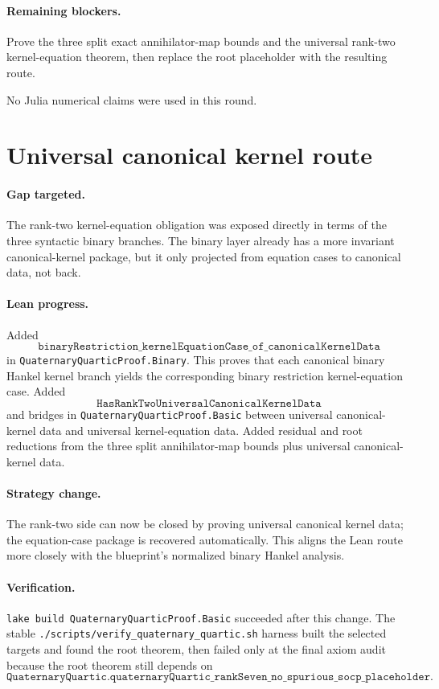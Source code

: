 \documentclass[11pt]{article}
\begin{document}
\paragraph{Remaining blockers.}
Prove the three split exact annihilator-map bounds and the universal rank-two
kernel-equation theorem, then replace the root placeholder with the resulting
route.

No Julia numerical claims were used in this round.

\section*{Universal canonical kernel route}

\paragraph{Gap targeted.}
The rank-two kernel-equation obligation was exposed directly in terms of the
three syntactic binary branches.  The binary layer already has a more invariant
canonical-kernel package, but it only projected from equation cases to canonical
data, not back.

\paragraph{Lean progress.}
Added
\[
\texttt{binaryRestriction\_kernelEquationCase\_of\_canonicalKernelData}
\]
in \texttt{QuaternaryQuarticProof.Binary}.  This proves that each canonical
binary Hankel kernel branch yields the corresponding binary restriction
kernel-equation case.  Added
\[
\texttt{HasRankTwoUniversalCanonicalKernelData}
\]
and bridges in \texttt{QuaternaryQuarticProof.Basic} between universal
canonical-kernel data and universal kernel-equation data.  Added residual and
root reductions from the three split annihilator-map bounds plus universal
canonical-kernel data.

\paragraph{Strategy change.}
The rank-two side can now be closed by proving universal canonical kernel data;
the equation-case package is recovered automatically.  This aligns the Lean
route more closely with the blueprint's normalized binary Hankel analysis.

\paragraph{Verification.}
\texttt{lake build QuaternaryQuarticProof.Basic} succeeded after this change.
The stable \texttt{./scripts/verify\_quaternary\_quartic.sh} harness built the
selected targets and found the root theorem, then failed only at the final axiom
audit because the root theorem still depends on
\[
\texttt{QuaternaryQuartic.quaternaryQuartic\_rankSeven\_no\_spurious\_socp\_placeholder}.
\]
\end{document}
